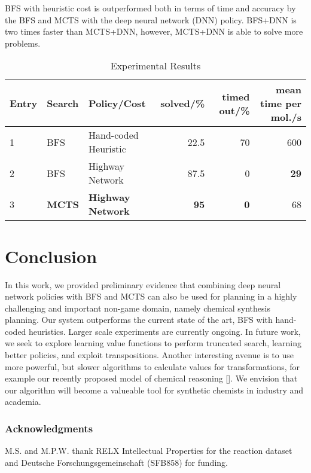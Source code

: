 \documentclass{article} %
\begin{document}
BFS with heuristic cost is outperformed both in terms of time and accuracy by the BFS and MCTS with the deep neural network (DNN) policy. BFS+DNN is two times faster than MCTS+DNN, however, MCTS+DNN is able to solve more problems.

\begin{table}[htdp]
\caption{Experimental Results}
\begin{center}
\begin{tabular}{lllrrr}
\toprule
Entry & Search & Policy/Cost & solved/\% & timed out/\% & mean time per mol./s\\
\midrule
1 & BFS & Hand-coded Heuristic & 22.5 & 70 & 600 \\
2 & BFS & Highway Network & 87.5 & 0 & \textbf{29}\\
3 & \textbf{MCTS} & \textbf{Highway Network} & \textbf{95} & \textbf{0} & 68\\
\bottomrule
\end{tabular}
\end{center}
\label{tab:exp}
\end{table}%



\section{Conclusion}
In this work, we provided preliminary evidence that combining deep neural network policies with BFS and MCTS can also be used for planning in a highly challenging and important non-game domain, namely chemical synthesis planning. Our system outperforms the current state of the art, BFS with hand-coded heuristics. Larger scale experiments are currently ongoing. In future work, we seek to explore learning value functions to perform truncated search, learning better policies, and exploit transpositions. Another interesting avenue is to use more powerful, but slower algorithms to calculate values for transformations, for example our recently proposed model of chemical reasoning [\cite{segler2017modelling}]. We envision that our algorithm will become a valueable tool for synthetic chemists in industry and academia.

\subsubsection*{Acknowledgments}
M.S. and M.P.W. thank RELX Intellectual Properties for the reaction dataset and Deutsche Forschungsgemeinschaft (SFB858) for funding.



\end{document}
